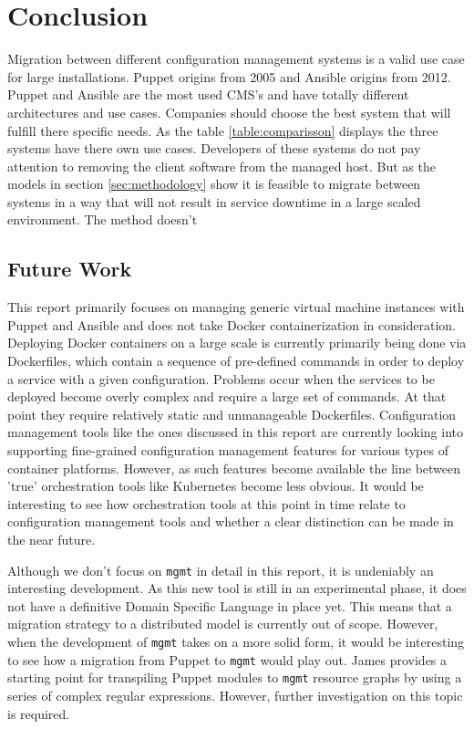 \section{Conclusion}\label{sec:conclusion}
Migration between different configuration management systems is a valid use case for large installations. Puppet origins from 2005 and Ansible origins from 2012. Puppet and Ansible are the most used CMS's and have totally different architectures and use cases. Companies should choose the best system that will fulfill there specific needs. As the table \ref{table:comparisson} displays the three systems have there own use cases. Developers of these systems do not pay attention to removing the client software from the managed host. But as the models in section \ref{sec:methodology} show it is feasible to migrate between systems in a way that will not result in service downtime in a large scaled environment. The method doesn't  

\subsection{Future Work}\label{subsec:futurework}
This report primarily focuses on managing generic virtual machine instances with Puppet and Ansible and does not take Docker containerization in consideration. Deploying Docker containers on a large scale is currently primarily being done via Dockerfiles, which contain a sequence of pre-defined commands in order to deploy a service with a given configuration. Problems occur when the services to be deployed become overly complex and require a large set of commands. At that point they require relatively static and unmanageable Dockerfiles. Configuration management tools like the ones discussed in this report are currently looking into supporting fine-grained configuration management features for various types of container platforms. However, as such features become available the line between 'true' orchestration tools like Kubernetes \cite{kubernetes_2016} become less obvious. It would be interesting to see how orchestration tools at this point in time relate to configuration management tools and whether a clear distinction can be made in the near future.

Although we don't focus on \texttt{mgmt} in detail in this report, it is undeniably an interesting development. As this new tool is still in an experimental phase, it does not have a definitive Domain Specific Language in place yet. This means that a migration strategy to a distributed model is currently out of scope. However, when the development of \texttt{mgmt} takes on a more solid form, it would be interesting to see how a migration from Puppet to \texttt{mgmt} would play out. James \cite{frank_2016} provides a starting point for transpiling Puppet modules to \texttt{mgmt} resource graphs by using a series of complex regular expressions. However, further investigation on this topic is required.
